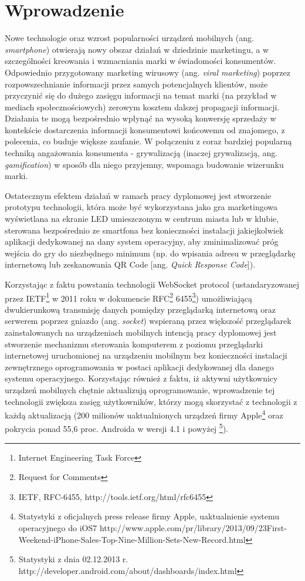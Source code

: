\section{Wprowadzenie}

Nowe technologie oraz wzrost popularności urządzeń mobilnych (ang. \emph{smartphone}) otwierają nowy obszar działań w dziedzinie marketingu, a w szczególności kreowania i wzmacniania marki w świadomości konsumentów. Odpowiednio przygotowany marketing wirusowy (ang. 
\emph{viral marketing}) poprzez rozpowszechnianie informacji przez samych potencjalnych klientów, może przyczynić się do dużego zasięgu informacji na temat marki (na przykład w mediach społecznościowych) zerowym kosztem dalszej propagacji informacji. Działania te mogą bezpośrednio wpłynąć na wysoką konwersję sprzedaży w kontekście dostarczenia informacji konsumentowi końcowemu od znajomego, z polecenia, co buduje większe zaufanie. W połączeniu z coraz bardziej popularną techniką angażowania konsumenta - grywalizacją (inaczej grywalizacją, ang. \emph{gamification}) w sposób dla niego przyjemny, wspomaga budowanie wizerunku marki.

Ostatecznym efektem działań w ramach pracy dyplomowej jest stworzenie prototypu technologii, która może być wykorzystana jako gra marketingowa wyświetlana na ekranie LED umieszczonym w centrum miasta lub w klubie, sterowana bezpośrednio ze smartfona bez konieczności instalacji jakiejkolwiek aplikacji dedykowanej na dany system operacyjny, aby zminimalizować próg wejścia do gry do niezbędnego minimum (np. do wpisania adresu w przeglądarkę internetową lub zeskanowania QR Code [ang. \emph{Quick Response Code}]).

Korzystając z faktu powstania technologii WebSocket protocol (ustandaryzowanej przez IETF\footnote{Internet Engineering Task Force} w 2011 roku w dokumencie RFC\footnote{Request for Comments} 6455\footnote{IETF, RFC-6455, http://tools.ietf.org/html/rfc6455}) umożliwiającą dwukierunkową transmisję danych pomiędzy przeglądarką internetową oraz serwerem poprzez gniazdo (ang. \emph{socket}) wspieraną przez większość przeglądarek zainstalowanych na urządzeniach mobilnych intencją pracy dyplomowej jest stworzenie mechanizmu sterowania komputerem z poziomu przeglądarki internetowej uruchomionej na urządzeniu mobilnym bez konieczności instalacji zewnętrznego oprogramowania w postaci aplikacji dedykowanej dla danego systemu operacyjnego. Korzystając również z faktu, iż aktywni użytkownicy urządzeń mobilnych chętnie aktualizują oprogramowanie, wprowadzenie tej technologii zwiększa zasięg użytkowników, którzy mogą skorzystać z technologii z każdą aktualizacją (200 milionów uaktualnionych urządzeń firmy Apple\footnote{Statystyki z oficjalnych press release firmy Apple, uaktualnienie systemu operacyjnego do iOS7 http://www.apple.com/pr/library/2013/09/23First-Weekend-iPhone-Sales-Top-Nine-Million-Sets-New-Record.html} oraz pokrycia ponad 55,6 proc. Androida w wersji 4.1 i powyżej \footnote{Statystyki z dnia 02.12.2013 r. http://developer.android.com/about/dashboards/index.html}).

